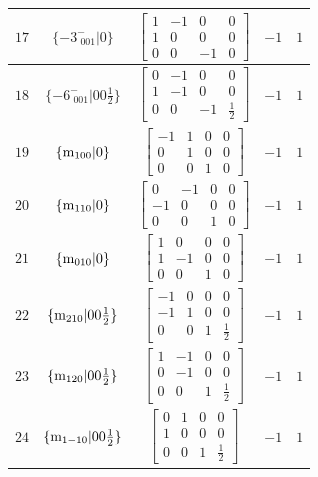 \documentclass[fleqn,8pt]{jsarticle}
\begin{document}
\begin{longtable}{ccccc}
$ 17 $ & $ \{-3^{-}_{\,\,001}|0\} $ & $ \begin{bmatrix} 1 & -1 & 0 & 0 \\ 1 & 0 & 0 & 0 \\ 0 & 0 & -1 & 0 \end{bmatrix} $ & $ -1 $ & $ 1 $ \\ \hline
$ 18 $ & $ \{-6^{-}_{\,\,001}|0 0 \frac{1}{2}\} $ & $ \begin{bmatrix} 0 & -1 & 0 & 0 \\ 1 & -1 & 0 & 0 \\ 0 & 0 & -1 & \frac{1}{2} \end{bmatrix} $ & $ -1 $ & $ 1 $ \\ \hline
$ 19 $ & $ \{{\rm m}_{100}|0\} $ & $ \begin{bmatrix} -1 & 1 & 0 & 0 \\ 0 & 1 & 0 & 0 \\ 0 & 0 & 1 & 0 \end{bmatrix} $ & $ -1 $ & $ 1 $ \\ \hline
$ 20 $ & $ \{{\rm m}_{110}|0\} $ & $ \begin{bmatrix} 0 & -1 & 0 & 0 \\ -1 & 0 & 0 & 0 \\ 0 & 0 & 1 & 0 \end{bmatrix} $ & $ -1 $ & $ 1 $ \\ \hline
$ 21 $ & $ \{{\rm m}_{010}|0\} $ & $ \begin{bmatrix} 1 & 0 & 0 & 0 \\ 1 & -1 & 0 & 0 \\ 0 & 0 & 1 & 0 \end{bmatrix} $ & $ -1 $ & $ 1 $ \\ \hline
$ 22 $ & $ \{{\rm m}_{210}|0 0 \frac{1}{2}\} $ & $ \begin{bmatrix} -1 & 0 & 0 & 0 \\ -1 & 1 & 0 & 0 \\ 0 & 0 & 1 & \frac{1}{2} \end{bmatrix} $ & $ -1 $ & $ 1 $ \\ \hline
$ 23 $ & $ \{{\rm m}_{120}|0 0 \frac{1}{2}\} $ & $ \begin{bmatrix} 1 & -1 & 0 & 0 \\ 0 & -1 & 0 & 0 \\ 0 & 0 & 1 & \frac{1}{2} \end{bmatrix} $ & $ -1 $ & $ 1 $ \\ \hline
$ 24 $ & $ \{{\rm m}_{1-10}|0 0 \frac{1}{2}\} $ & $ \begin{bmatrix} 0 & 1 & 0 & 0 \\ 1 & 0 & 0 & 0 \\ 0 & 0 & 1 & \frac{1}{2} \end{bmatrix} $ & $ -1 $ & $ 1 $ \\ \hline

\end{longtable}
\end{document}
